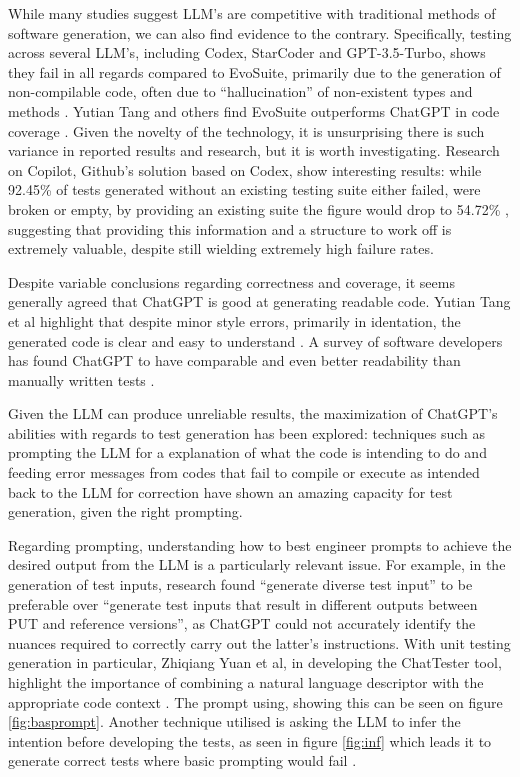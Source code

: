 While many studies suggest LLM's are competitive with traditional methods of software generation, we can also find evidence to the contrary. Specifically, testing across several LLM's, including Codex, StarCoder and GPT-3.5-Turbo, shows they fail in all regards compared to EvoSuite, primarily due to the generation of non-compilable code, often due to ``hallucination'' of non-existent types and methods \citep{kn:siddiq2023empirical}. Yutian Tang and others find EvoSuite outperforms ChatGPT in code coverage \citep{kn:tang2023chatgpt}. Given the novelty of the technology, it is unsurprising there is such variance in reported results and research, but it is worth investigating. Research on Copilot, Github's solution based on Codex, show interesting results: while 92.45\% of tests generated without an existing testing suite either failed, were broken or empty, by providing an existing suite the figure would drop to 54.72\% \citep{kn:githubcopilot}, suggesting that providing this information and a structure to work off is extremely valuable, despite still wielding extremely high failure rates.

Despite variable conclusions regarding correctness and coverage, it seems generally agreed that ChatGPT is good at generating readable code. Yutian Tang et al highlight that despite minor style errors, primarily in identation, the generated code is clear and easy to understand \citep{kn:tang2023chatgpt}. A survey of software developers has found ChatGPT to have comparable and even better readability than manually written tests \citep{kn:chattester}.


Given the LLM can produce unreliable results, the maximization of ChatGPT's abilities with regards to test generation has been explored: techniques such as prompting the LLM for a explanation of what the code is intending to do \cite{kn:nuances} and feeding error messages from codes that fail to compile or execute as intended back to the LLM for correction \cite{kn:chattester} have shown an amazing capacity for test generation, given the right prompting.

Regarding prompting, understanding how to best engineer prompts to achieve the desired output from the LLM is a particularly relevant issue. For example, in the generation of test inputs, research found “generate diverse test input” to be preferable over “generate test inputs that result in different outputs between PUT and reference versions”, as ChatGPT could not accurately identify the nuances required to correctly carry out the latter's instructions. \citep{kn:nuances}
With unit testing generation in particular, Zhiqiang Yuan et al, in developing the ChatTester tool, highlight the importance of combining a natural language descriptor with the appropriate code context \citep{kn:chattester}. The prompt using, showing this can be seen on figure \ref{fig:basprompt}. Another technique utilised is asking the LLM to infer the intention before developing the tests, as seen in figure \ref{fig:inf} which leads it to generate correct tests where basic prompting would fail \citep{kn:chattester}.


